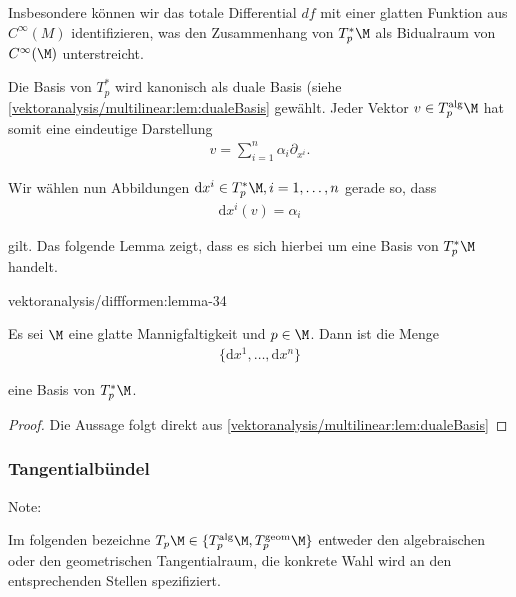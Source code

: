 \documentclass[letterpaper,10pt,english]{jupyterBook}
\begin{document}
\par
Insbesondere können wir das totale Differential \(df\) mit einer glatten Funktion aus \(C^\infty(M)\) identifizieren, was den Zusammenhang von \(T^\ast_p \M\) als Bidualraum von \(C^\infty(\M)\) unterstreicht.

\par
Die Basis von \(T^\ast_p\) wird kanonisch als duale Basis (siehe \cref{vektoranalysis/multilinear:lem:dualeBasis}  gewählt.
Jeder Vektor \(v\in T_p^{\text{alg}}\M\) hat somit eine eindeutige Darstellung
\begin{align*}
v = \sum_{i=1}^n \alpha_i \partial_{x^i}.
\end{align*}
\par
Wir wählen nun Abbildungen \(\mathrm{d}x^i\in T^\ast_p\M, i=1,\ldots,n\) gerade so, dass
\begin{align*}
\mathrm{d}x^i(v) = \alpha_i
\end{align*}
\par
gilt.
Das folgende Lemma zeigt, dass es sich hierbei um eine Basis von \(T^\ast_p\M\) handelt.
\begin{lemma}{}{vektoranalysis/diffformen:lemma-34}



\par
Es sei \(\M\) eine glatte Mannigfaltigkeit und \(p\in\M\).
Dann ist die Menge
\begin{align*}
\{\mathrm{d}x^1,\ldots, \mathrm{d}x^n\}
\end{align*}
\par
eine Basis von \(T_p^\ast\M\).
\end{lemma}

\begin{proof}
 Die Aussage folgt direkt aus \cref{vektoranalysis/multilinear:lem:dualeBasis} 
\end{proof}


\subsubsection{Tangentialbündel}
\label{\detokenize{vektoranalysis/diffformen:tangentialbundel}}
\begin{emphBox}{}{}{Note:}
\par
Im folgenden bezeichne \(T_p\M\in\{T^{\text{alg}}_p\M, T^{\text{geom}}_p\M \}\) entweder den algebraischen oder den geometrischen Tangentialraum, die konkrete Wahl wird an den entsprechenden Stellen spezifiziert.
\end{emphBox}
\end{document}
